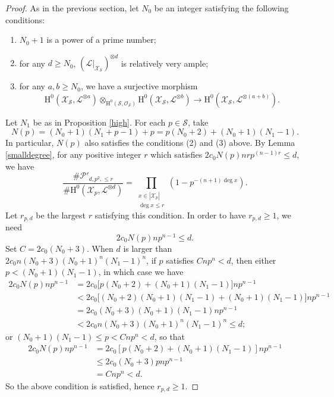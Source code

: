 \documentclass[11pt]{article}
\numberwithin{equation}{section}
\theoremstyle{plain}
\theoremstyle{definition}
\newcommand{\ho}{\mathrm{H}}
\newcommand{\X}{\mathcal{X}}
\newcommand{\li}{\mathcal{L}}
\begin{document}
\begin{proof}
As in the previous section, let $N_0$ be an integer satisfying the following conditions:
\begin{enumerate}
\item $N_0+1$ is a power of a prime number;
\item for any $d\geq N_0$, $(\li|_{\X_\mathcal{S}})^{\otimes d}$ is relatively very ample;
\item for any $a,b\geq N_0$, we have a surjective morphism
\[
\ho^0(\X_{\mathcal{S}}, \li^{\otimes a}) \otimes_{\ho^0(\mathcal{S}, \mathcal{O}_{\mathcal{S}})}\ho^0(\X_{\mathcal{S}}, \li^{\otimes b})\to \ho^0(\X_{\mathcal{S}}, \li^{\otimes (a+b)}).
\]
\end{enumerate}

Let $N_1$ be as in Proposition \ref{high}.
For each $p\in \mathcal{S}$, take
\[
N(p)=(N_0+1)(N_1+p-1)+p=p(N_0+2)+(N_0+1)(N_1-1).
\]
In particular, $N(p)$ also satisfies the conditions (2) and (3) above.
By Lemma \ref{smalldegree}, for any positive integer $r$ which satisfies $2c_0N(p)nrp^{(n-1)r}\leq d$, we have
\[
\frac{\#\mathcal{P}'_{d,p^2,\leq r}}{\#\ho^0(\X_{p}, \li^{\otimes d})}=\prod_{\substack{x\in |\X_{p}|\\ \deg x\leq r}} \left(1-p^{-(n+1)\deg x} \right).
\]
Let $r_{p,d}$ be the largest $r$ satisfying this condition. In order to have $r_{p,d}\geq 1$, we need
\[
2c_0N(p)np^{n-1}\leq d.
\]
Set $C=2c_0(N_0+3)$. When $d$ is larger than $2c_0n(N_0+3)(N_0+1)^n(N_1-1)^n$, if $p$ satisfies $Cnp^n<d$, then either $p<(N_0+1)(N_1-1)$, in which case we have
\begin{align*}
2c_0N(p)np^{n-1} &= 2c_0\Big[ p(N_0+2)+(N_0+1)(N_1-1)\Big]np^{n-1} \\
&<2c_0\Big[ (N_0+2)(N_0+1)(N_1-1)+(N_0+1)(N_1-1)\Big]np^{n-1}\\
&=2c_0(N_0+3)(N_0+1)(N_1-1)np^{n-1}\\
&<2c_0n(N_0+3)(N_0+1)^n(N_1-1)^n\leq d;
\end{align*}
or $(N_0+1)(N_1-1)\leq p <Cnp^n<d$, so that
\begin{align*}
2c_0N(p)np^{n-1}&= 2c_0[p(N_0+2)+(N_0+1)(N_1-1)]np^{n-1} \\
&\leq 2c_0(N_0+3)pnp^{n-1}\\
&=Cnp^n<d.
\end{align*}
So the above condition is satisfied, hence $r_{p,d}\geq 1$.


\end{proof}
\end{document}
